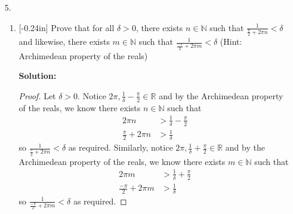 \documentclass[letterpaper,12pt]{article}
\theoremstyle{definition}
\begin{document}
\begin{enumerate}
       \item[5.]  \begin{enumerate}
        \item \reversemarginpar{}[-0.24in] Prove that for all $\delta > 0$, there exists $n \in \mathbb{N}$ such that $\frac{1}{\frac{\pi}{2}+2\pi n} < \delta$ and likewise, there exists $m \in \mathbb{N}$ such that  $\frac{1}{\frac{-\pi}{2}+2\pi m} < \delta$ (Hint: Archimedean property of the reals)
    \begin{mdframed}
        \textbf{Solution:}
        \begin{proof}
           Let $\delta > 0$. Notice $2\pi , \frac{1}{\delta} - \frac{\pi}{2} \in \mathbb{R}$ and by the Archimedean property of the reals, we know there exists $n \in \mathbb{N}$ such that \begin{align*}
               2\pi n &> \frac{1}{\delta} - \frac{\pi}{2} \\
             \frac{\pi}{2} + 2\pi n &> \frac{1}{\delta} 
           \end{align*}
           so $\frac{1}{\frac{\pi}{2}+2\pi n} < \delta$ as required. Similarly, notice $2\pi , \frac{1}{\delta} + \frac{\pi}{2} \in \mathbb{R}$ and by the Archimedean property of the reals, we know there exists $m \in \mathbb{N}$ such that \begin{align*}
               2\pi m &> \frac{1}{\delta} + \frac{\pi}{2} \\
             \frac{-\pi}{2} + 2\pi m &> \frac{1}{\delta} 
           \end{align*}
           so $\frac{1}{\frac{-\pi}{2}+2\pi m} < \delta$ as required. 
        \end{proof}
    \end{mdframed}
    \end{enumerate}
\end{enumerate}
\pagebreak
\end{document}
